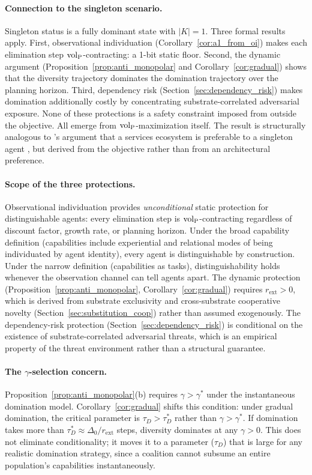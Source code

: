 \paragraph{Connection to the singleton scenario.} Singleton status is a
fully dominant state with $|K| = 1$. Three formal results apply. First, observational individuation
(Corollary~\ref{cor:a1_from_oi}) makes each elimination step
${\operatorname{vol}_{\mathrm{P}}}$-contracting: a 1-bit static floor. Second, the dynamic argument
(Proposition~\ref{prop:anti_monopolar} and Corollary~\ref{cor:gradual})
shows that the diversity trajectory dominates the domination trajectory over
the planning horizon. Third, dependency risk
(Section~\ref{sec:dependency_risk}) makes domination additionally costly by
concentrating substrate-correlated adversarial exposure. None of these
protections is a safety constraint imposed from outside the objective. All
emerge from ${\operatorname{vol}_{\mathrm{P}}}$-maximization itself. The result is structurally analogous to
\citeauthor{drexler2019reframing}'s argument that a services ecosystem is
preferable to a singleton agent \citep{drexler2019reframing}, but derived
from the objective rather than from an architectural preference.

\paragraph{Scope of the three protections.} Observational individuation
provides \emph{unconditional} static protection for distinguishable agents:
every elimination step is ${\operatorname{vol}_{\mathrm{P}}}$-contracting regardless of discount factor,
growth rate, or planning horizon. Under the broad capability definition
(capabilities include experiential and relational modes of being
individuated by agent identity), every agent is distinguishable by
construction. Under the narrow definition (capabilities as tasks),
distinguishability holds whenever the observation channel can tell agents
apart. The dynamic protection (Proposition~\ref{prop:anti_monopolar},
Corollary~\ref{cor:gradual}) requires $r_{\mathrm{ext}} > 0$, which is
derived from substrate exclusivity and cross-substrate cooperative novelty
(Section~\ref{sec:substitution_coop}) rather than assumed exogenously. The
dependency-risk protection (Section~\ref{sec:dependency_risk}) is
conditional on the existence of substrate-correlated adversarial threats,
which is an empirical property of the threat environment rather than a
structural guarantee.

\paragraph{The $\gamma$-selection concern.}
Proposition~\ref{prop:anti_monopolar}(b) requires $\gamma > \gamma^*$ under
the instantaneous domination model. Corollary~\ref{cor:gradual} shifts this
condition: under gradual domination, the critical parameter is
$\tau_D > \tau_D^*$ rather than $\gamma > \gamma^*$. If domination takes
more than $\tau_D^* \approx \Delta_0 / r_{\mathrm{ext}}$ steps, diversity
dominates at any $\gamma > 0$. This does not eliminate conditionality; it
moves it to a parameter ($\tau_D$) that is large for any realistic
domination strategy, since a coalition cannot subsume an entire population's
capabilities instantaneously.

